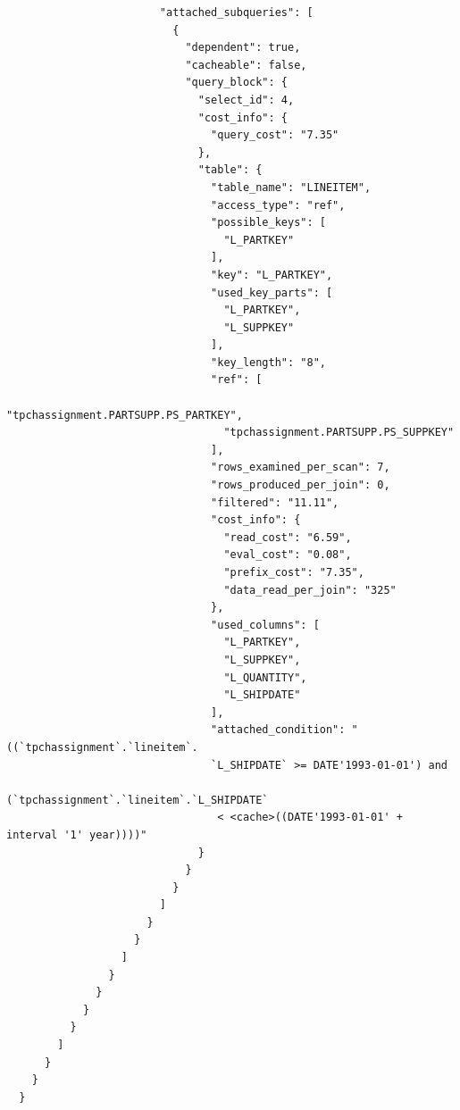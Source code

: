 \documentclass{article}
\begin{document}
\begin{lstlisting}
                        "attached_subqueries": [
                          {
                            "dependent": true,
                            "cacheable": false,
                            "query_block": {
                              "select_id": 4,
                              "cost_info": {
                                "query_cost": "7.35"
                              },
                              "table": {
                                "table_name": "LINEITEM",
                                "access_type": "ref",
                                "possible_keys": [
                                  "L_PARTKEY"
                                ],
                                "key": "L_PARTKEY",
                                "used_key_parts": [
                                  "L_PARTKEY",
                                  "L_SUPPKEY"
                                ],
                                "key_length": "8",
                                "ref": [
                                  "tpchassignment.PARTSUPP.PS_PARTKEY",
                                  "tpchassignment.PARTSUPP.PS_SUPPKEY"
                                ],
                                "rows_examined_per_scan": 7,
                                "rows_produced_per_join": 0,
                                "filtered": "11.11",
                                "cost_info": {
                                  "read_cost": "6.59",
                                  "eval_cost": "0.08",
                                  "prefix_cost": "7.35",
                                  "data_read_per_join": "325"
                                },
                                "used_columns": [
                                  "L_PARTKEY",
                                  "L_SUPPKEY",
                                  "L_QUANTITY",
                                  "L_SHIPDATE"
                                ],
                                "attached_condition": "((`tpchassignment`.`lineitem`.
                                `L_SHIPDATE` >= DATE'1993-01-01') and 
                                (`tpchassignment`.`lineitem`.`L_SHIPDATE`
                                 < <cache>((DATE'1993-01-01' + interval '1' year))))"
                              }
                            }
                          }
                        ]
                      }
                    }
                  ]
                }
              }
            }
          }
        ]
      }
    }
  }
  \end{lstlisting}
\end{document}
